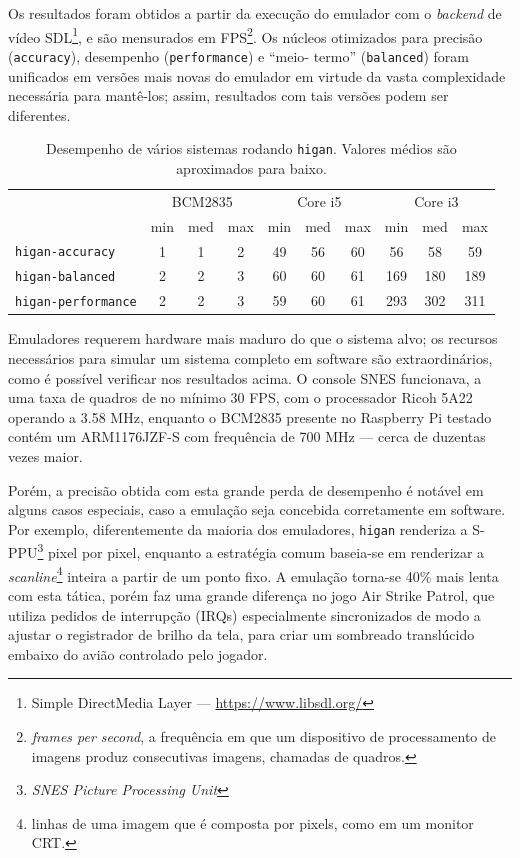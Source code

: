 \documentclass[12pt]{sftex/sftex}
\begin{document}
Os resultados foram obtidos a partir da execução do emulador com o
\emph{backend} de vídeo SDL\footnote{Simple DirectMedia Layer ---
\url{https://www.libsdl.org/}}, e são mensurados em FPS\footnote{\emph{frames
per second}, a frequência em que um dispositivo de processamento de imagens
produz consecutivas imagens, chamadas de quadros.}. Os núcleos otimizados para
precisão (\texttt{accuracy}), desempenho (\texttt{performance}) e ``meio-
termo'' (\texttt{balanced}) foram unificados em versões mais novas do emulador
em virtude da vasta complexidade necessária para mantê-los; assim, resultados
com tais versões podem ser diferentes.

\begin{table}[ht]
\centering
\begin{tabular}{lccccccccc}
& \multicolumn{3}{c}{BCM2835} & \multicolumn{3}{c}{Core i5}
    & \multicolumn{3}{c}{Core i3} \\
& min & med & max & min & med & max & min & med & max \\
\texttt{higan-accuracy}
    & 1   & 1   & 2   & 49  & 56  & 60  & 56  & 58  & 59  \\
\texttt{higan-balanced}
    & 2   & 2   & 3   & 60  & 60  & 61  & 169 & 180 & 189 \\
\texttt{higan-performance}
    & 2   & 2   & 3   & 59  & 60  & 61  & 293 & 302 & 311 \\
\end{tabular}
\caption{Desempenho de vários sistemas rodando \texttt{higan}. Valores médios
são aproximados para baixo.}
\end{table}

Emuladores requerem hardware mais maduro do que o sistema alvo; os recursos
necessários para simular um sistema completo em software são extraordinários,
como é possível verificar nos resultados acima. O console SNES funcionava, a uma
taxa de quadros de no mínimo 30 FPS, com o processador Ricoh 5A22 operando a
3.58 MHz, enquanto o BCM2835 presente no Raspberry Pi testado contém um
ARM1176JZF-S com frequência de 700 MHz --- cerca de duzentas vezes maior.

Porém, a precisão obtida com esta grande perda de desempenho é notável em alguns
casos especiais, caso a emulação seja concebida corretamente em software. Por
exemplo, diferentemente da maioria dos emuladores, \texttt{higan} renderiza a
S-PPU\footnote{\emph{SNES Picture Processing Unit}} pixel por pixel, enquanto a
estratégia comum baseia-se em renderizar a \emph{scanline}\footnote{linhas de
uma imagem que é composta por pixels, como em um monitor CRT.} inteira a partir
de um ponto fixo. A emulação torna-se 40\% mais lenta~\cite{emustate} com esta
tática, porém faz uma grande diferença no jogo Air Strike Patrol, que utiliza
pedidos de interrupção (IRQs) especialmente sincronizados de modo a ajustar o
registrador de brilho da tela, para criar um sombreado translúcido embaixo do
avião controlado pelo jogador.
\end{document}
